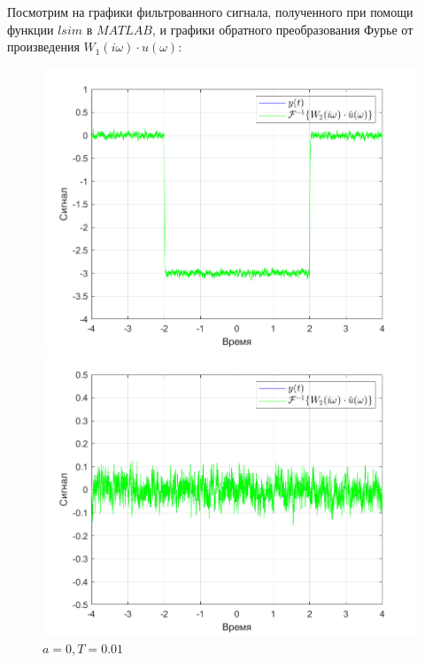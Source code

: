 \documentclass[a4paper]{article}
\begin{document}
Посмотрим на графики фильтрованного сигнала, полученного при помощи функции $lsim$ в $MATLAB$, и графики обратного преобразования Фурье от произведения $W_1(i\omega) \cdot \hat{u}(\omega)$:

\begin{figure}[H]
    \begin{minipage}{0.5\textwidth}
        \centering
        \includegraphics[width=\linewidth]{ex1_1/a=-3_T=0.01/h2.png}
        \caption{$a = -3, T = 0.01$}
    \end{minipage}
    \begin{minipage}{0.5\textwidth}
        \centering
        \includegraphics[width=\linewidth]{ex1_1/a=0_T=0.01/h2.png}
        \caption{$a = 0, T = 0.01$}
    \end{minipage}
\end{figure}
\end{document}
